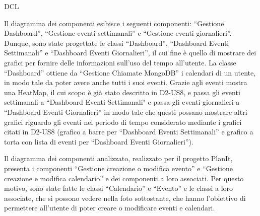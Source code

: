 \begin{listaPersonale}{DCL}
    
        \begin{center}
            
        \end{center}
    
        

    Il diagramma dei componenti esibisce i seguenti componenti: “Gestione Dashboard”, “Gestione eventi settimanali” e “Gestione eventi giornalieri”. Dunque, sono state progettate le classi “Dashboard”, “Dashboard Eventi Settimanali” e “Dashboard Eventi Giornalieri”, il cui fine è quello di mostrare dei grafici per fornire delle informazioni sull'uso del tempo all'utente.
    La classe “Dashboard” ottiene da “Gestione Chiamate MongoDB” i calendari di un utente, in modo tale da poter avere anche tutti i suoi eventi. Grazie agli eventi mostra una HeatMap, il cui scopo è già stato descritto in D2-US8, e passa gli eventi settimanali a “Dashboard Eventi Settimanali" e passa gli eventi giornalieri a “Dashboard Eventi Giornalieri” in modo tale che questi possano mostrare altri grafici riguardo gli eventi nel periodo di tempo considerato mediante i grafici citati in D2-US8 (grafico a barre per “Dashboard Eventi Settimanali” e grafico a torta con lista di eventi per “Dashboard Eventi Giornalieri”).
    
    
        \begin{center}
            
        \end{center}
    
        


    Il diagramma dei componenti analizzato, realizzato per il progetto PlanIt, presenta i componenti “Gestione creazione o modifica evento” e “Gestione creazione e modifica calendario” e dei componenti a loro associati. Per questo motivo, sono state fatte le classi “Calendario” e “Evento” e le classi a loro associate, che si possono vedere nella foto sottostante, che hanno l'obiettivo di permettere all'utente di poter creare o modificare eventi e calendari.
    

\end{listaPersonale}
